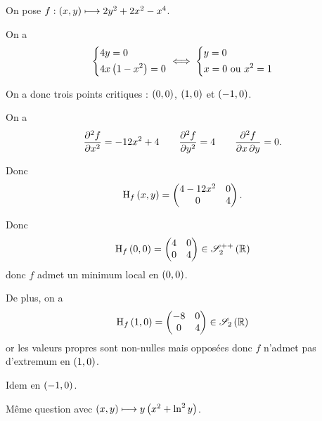 \begin{corr}
On pose \(f:\left(x,y\right)\longmapsto2y^2+2x^2-x^4\).

On a \[\begin{dcases}
4y=0 \\
4x\left(1-x^2\right)=0
\end{dcases}\iff\begin{dcases}
y=0 \\
x=0\text{ ou }x^2=1
\end{dcases}\]

On a donc trois points critiques : \(\left(0,0\right)\), \(\left(1,0\right)\) et \(\left(-1,0\right)\).

On a \[\pdv[order=2]{f}{x}=-12x^2+4\qquad\pdv[order=2]{f}{y}=4\qquad\pdv{f}{x,y}=0.\]

Donc \[\operatorname{H}_{f}\left(x,y\right)=\begin{pmatrix}
4-12x^2 & 0 \\
0 & 4
\end{pmatrix}.\]

Donc \[\hessienne{f}\paren{0,0}=\begin{pmatrix}
4 & 0 \\
0 & 4
\end{pmatrix}\in\symdefpos{2}[\R]\] donc \(f\) admet un minimum local en \(\left(0,0\right)\).

De plus, on a \[\hessienne{f}\paren{1,0}=\begin{pmatrix}
-8 & 0 \\
0 & 4
\end{pmatrix}\in\sym{2}[\R]\] or les valeurs propres sont non-nulles mais opposées donc \(f\) n'admet pas d'extremum en \(\left(1,0\right)\).

Idem en \(\left(-1,0\right)\).
\end{corr}

\begin{exo}
Même question avec \(\left(x,y\right)\longmapsto y\left(x^2+\ln^2y\right)\).
\end{exo}

